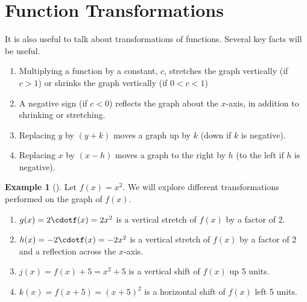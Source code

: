 \documentclass[10pt,]{book}
\theoremstyle{plain}
\theoremstyle{definition}
\theoremstyle{definition}
\theoremstyle{definition}
\newtheorem{example}[theorem]{Example}
\theoremstyle{definition}
\numberwithin{equation}{section}
\let\oldsection\section
\renewcommand\section{\znewpage\oldsection}
\newcommand{\lt}{<}
\newcommand{\gt}{>}
\begin{document}
\section[{Function Transformations}]{Function Transformations}\label{subsection-9}
\hypertarget{p-94}{}%
It is also useful to talk about transformations of functions.  Several key facts will be useful.%
\begin{assemblage}\label{assemblage-13}
\hypertarget{p-95}{}%
\leavevmode%
\begin{enumerate}
\item\hypertarget{li-20}{}Multiplying a function by a constant, \(c\), stretches the graph vertically (if \(c \gt 1\)) or shrinks the graph vertically (if \(0 \lt c \lt 1\))%
\item\hypertarget{li-21}{}A negative sign (if \(c \lt 0\)) reflects the graph about the \(x\)-axis, in addition to shrinking or stretching.%
\item\hypertarget{li-22}{}Replacing \(y\) by \((y+k)\) moves a graph up by \(k\) (down if \(k\) is negative).%
\item\hypertarget{li-23}{}Replacing \(x\) by \((x-h)\) moves a graph to the right by \(h\) (to the left if \(h\) is negative).%
\end{enumerate}
%
\end{assemblage}
\begin{example}[]\label{example-12}
\hypertarget{p-96}{}%
Let \(f(x)=x^2\). We will explore different transformations performed on the graph of \(f(x)\).%
\par
\hypertarget{p-97}{}%
\leavevmode%
\begin{enumerate}[label=\alph*]
\item\hypertarget{li-24}{}\hypertarget{p-98}{}%
\(g(x)=2\cdotf(x)=2x^2\) is a vertical stretch of \(f(x)\) by a factor of 2.%
\item\hypertarget{li-25}{}\hypertarget{p-99}{}%
\(h(x)=-2\cdotf(x)=-2x^2\) is a vertical stretch of \(f(x)\) by a factor of 2 and a reflection across the \(x\)-axis.%
\item\hypertarget{li-26}{}\hypertarget{p-100}{}%
\(j(x)=f(x)+5=x^2+5\) is a vertical shift of \(f(x)\) up 5 units.%
\item\hypertarget{li-27}{}\hypertarget{p-101}{}%
\(k(x)=f(x+5)=(x+5)^2\) is a horizontal shift of \(f(x)\) left 5 units.%
\end{enumerate}
%
\end{example}
\end{document}
